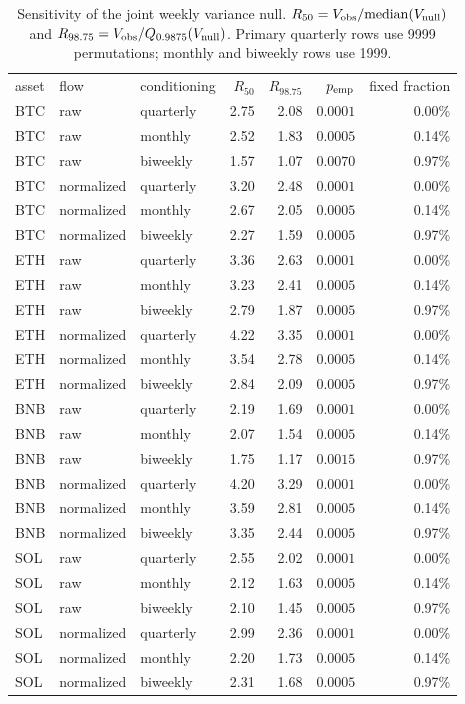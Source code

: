 \begin{table}[!htbp]
\footnotesize
\setlength{\tabcolsep}{8pt}
\caption{Sensitivity of the joint weekly variance null. $R_{50}=V_{\rm obs}/\mathrm{median}(V_{\rm null})$ and $R_{98.75}=V_{\rm obs}/Q_{0.9875}(V_{\rm null})$. Primary quarterly rows use 9999 permutations; monthly and biweekly rows use 1999.}
\label{tab:supp-null}
\begin{ruledtabular}
\begin{tabular}{lllrrrr}
asset & flow & conditioning & $R_{50}$ & $R_{98.75}$ & $p_{\rm emp}$ & fixed fraction \\
\colrule
BTC & raw & quarterly & 2.75 & 2.08 & $0.0001$ & 0.00\% \\
BTC & raw & monthly & 2.52 & 1.83 & $0.0005$ & 0.14\% \\
BTC & raw & biweekly & 1.57 & 1.07 & $0.0070$ & 0.97\% \\
BTC & normalized & quarterly & 3.20 & 2.48 & $0.0001$ & 0.00\% \\
BTC & normalized & monthly & 2.67 & 2.05 & $0.0005$ & 0.14\% \\
BTC & normalized & biweekly & 2.27 & 1.59 & $0.0005$ & 0.97\% \\
ETH & raw & quarterly & 3.36 & 2.63 & $0.0001$ & 0.00\% \\
ETH & raw & monthly & 3.23 & 2.41 & $0.0005$ & 0.14\% \\
ETH & raw & biweekly & 2.79 & 1.87 & $0.0005$ & 0.97\% \\
ETH & normalized & quarterly & 4.22 & 3.35 & $0.0001$ & 0.00\% \\
ETH & normalized & monthly & 3.54 & 2.78 & $0.0005$ & 0.14\% \\
ETH & normalized & biweekly & 2.84 & 2.09 & $0.0005$ & 0.97\% \\
BNB & raw & quarterly & 2.19 & 1.69 & $0.0001$ & 0.00\% \\
BNB & raw & monthly & 2.07 & 1.54 & $0.0005$ & 0.14\% \\
BNB & raw & biweekly & 1.75 & 1.17 & $0.0015$ & 0.97\% \\
BNB & normalized & quarterly & 4.20 & 3.29 & $0.0001$ & 0.00\% \\
BNB & normalized & monthly & 3.59 & 2.81 & $0.0005$ & 0.14\% \\
BNB & normalized & biweekly & 3.35 & 2.44 & $0.0005$ & 0.97\% \\
SOL & raw & quarterly & 2.55 & 2.02 & $0.0001$ & 0.00\% \\
SOL & raw & monthly & 2.12 & 1.63 & $0.0005$ & 0.14\% \\
SOL & raw & biweekly & 2.10 & 1.45 & $0.0005$ & 0.97\% \\
SOL & normalized & quarterly & 2.99 & 2.36 & $0.0001$ & 0.00\% \\
SOL & normalized & monthly & 2.20 & 1.73 & $0.0005$ & 0.14\% \\
SOL & normalized & biweekly & 2.31 & 1.68 & $0.0005$ & 0.97\% \\
\end{tabular}
\end{ruledtabular}
\end{table}


